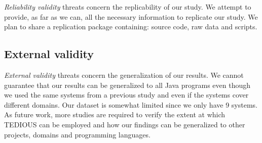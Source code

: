 
\textit{Reliability validity} threats concern the replicability of our study. We attempt to provide, as far as we can, all the necessary information to replicate our study. We plan to share a replication package containing: source code, raw data and scripts.

\subsection{External validity}


\textit{External validity} threats concern the generalization of our results. We cannot guarantee that our results can be generalized to all Java programs even though we used the same systems from a previous study \citep{maldonado17} and even if the systems cover different domains. Our dataset is somewhat limited since we only have 9 systems. As future work, more studies are required to verify the extent at which TEDIOUS can be employed and how our findings can be generalized to other projects, domains and programming languages.








